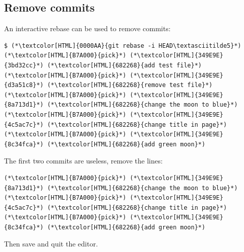 \subsection{Remove commits}
\begin{frame}[fragile]
  \subslidetitle
  An interactive rebase can be used to remove commits:
  \begin{lstlisting}
$ (*\textcolor[HTML]{0000AA}{git rebase -i HEAD\textasciitilde5}*)
(*\textcolor[HTML]{B7A000}{pick}*) (*\textcolor[HTML]{349E9E}{3bd32cc}*) (*\textcolor[HTML]{682268}{add test file}*)
(*\textcolor[HTML]{B7A000}{pick}*) (*\textcolor[HTML]{349E9E}{d3a51c8}*) (*\textcolor[HTML]{682268}{remove test file}*)
(*\textcolor[HTML]{B7A000}{pick}*) (*\textcolor[HTML]{349E9E}{8a713d1}*) (*\textcolor[HTML]{682268}{change the moon to blue}*)
(*\textcolor[HTML]{B7A000}{pick}*) (*\textcolor[HTML]{349E9E}{4c5ac7c}*) (*\textcolor[HTML]{682268}{change title in page}*)
(*\textcolor[HTML]{B7A000}{pick}*) (*\textcolor[HTML]{349E9E}{8c34fca}*) (*\textcolor[HTML]{682268}{add green moon}*)
\end{lstlisting}
  The first two commits are useless, remove the lines:
  \begin{lstlisting}
(*\textcolor[HTML]{B7A000}{pick}*) (*\textcolor[HTML]{349E9E}{8a713d1}*) (*\textcolor[HTML]{682268}{change the moon to blue}*)
(*\textcolor[HTML]{B7A000}{pick}*) (*\textcolor[HTML]{349E9E}{4c5ac7c}*) (*\textcolor[HTML]{682268}{change title in page}*)
(*\textcolor[HTML]{B7A000}{pick}*) (*\textcolor[HTML]{349E9E}{8c34fca}*) (*\textcolor[HTML]{682268}{add green moon}*)
\end{lstlisting}


  Then save and quit the editor.

\end{frame}

